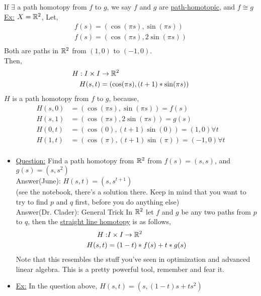 \documentclass[../notes.tex]{subfiles}
\begin{document}
    \begin{definition} If $\exists$ a path homotopy from $f$ to $g$, we say $f$ and $g$ are \underline{path-homotopic}, and $f\cong g$\\
        \underline{Ex:} $X=\mathbb{R}^2$, Let,
        \begin{align*}
            f(s)=(\cos(\pi s), \sin(\pi s))\\
            f(s)=(\cos(\pi s), 2\sin(\pi s))\\
        \end{align*}
        Both are paths in $\mathbb{R}^2$ from $(1,0)$ to $(-1,0)$.\\
        Then,
        \begin{align*}
            H: I\times I &\rightarrow \mathbb{R}^2\\
            H(s,t)&=(\cos(\pi s), (t+1)*\sin(\pi s))\\
        \end{align*}
        $H$ is a path homotopy from $f$ to $g$, because,
        \begin{align*}
            H(s,0)&=(\cos(\pi s), \sin(\pi s))=f(s)\\
            H(s,1)&=(\cos(\pi s), 2\sin(\pi s))=g(s)\\
            H(0,t)&=(\cos(0), (t+1)\sin(0))=(1,0)\forall t\\
            H(1,t)&=(\cos(\pi), (t+1)\sin(\pi))=(-1,0)\forall t\\
        \end{align*}
    \end{definition}
    \begin{itemize}
        \item \underline{Question:} Find a path homotopy from $\mathbb{R}^2$ from $f(s)=(s,s)$, and $g(s)=(s,s^2)$\\
            Answer(June): $H(s,t)=(s,s^{t+1})$\\
            (see the notebook, there's a solution there. Keep in mind that you want to try to find $p$ and $q$ first, before you do anything else)\\
            Answer(Dr. Clader): General Trick In $\mathbb{R}^2$ let $f$ and $g$ be any two paths from $p$ to $q$, then the
            \underline{straight line homotopy} is as follows,
            \begin{align*}
                H: &I \times I \rightarrow \mathbb{R}^2\\
                H(s,t)&=(1-t)*f(s)+t*g(s)\\
            \end{align*}
            Note that this resembles the stuff you've seen in optimization and advanced linear algebra. This is a pretty powerful tool,
            remember and fear it.
        \item \underline{Ex:} In the question above, $H(s, t)=(s, (1-t)s+ts^2)$
    \end{itemize}
\end{document}
